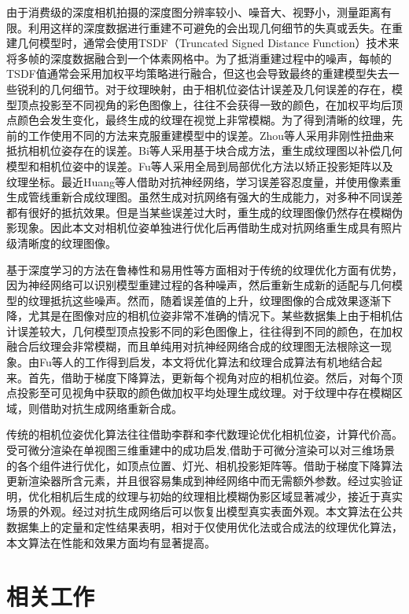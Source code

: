 由于消费级的深度相机拍摄的深度图分辨率较小、噪音大、视野小，测量距离有限。利用这样的深度数据进行重建不可避免的会出现几何细节的失真或丢失。在重建几何模型时，通常会使用TSDF（Truncated Signed Distance Function）技术来将多帧的深度数据融合到一个体素网格中。为了抵消重建过程中的噪声，每帧的TSDF值通常会采用加权平均策略进行融合，但这也会导致最终的重建模型失去一些锐利的几何细节。对于纹理映射，由于相机位姿估计误差及几何误差的存在，模型顶点投影至不同视角的彩色图像上，往往不会获得一致的颜色，在加权平均后顶点颜色会发生变化，最终生成的纹理在视觉上非常模糊。为了得到清晰的纹理，先前的工作使用不同的方法来克服重建模型中的误差。Zhou等人采用非刚性扭曲来抵抗相机位姿存在的误差。Bi等人采用基于块合成方法，重生成纹理图以补偿几何模型和相机位姿中的误差。Fu等人采用全局到局部优化方法以矫正投影矩阵以及纹理坐标。最近Huang等人借助对抗神经网络，学习误差容忍度量，并使用像素重生成管线重新合成纹理图。虽然生成对抗网络有强大的生成能力，对多种不同误差都有很好的抵抗效果。但是当某些误差过大时，重生成的纹理图像仍然存在模糊伪影现象。因此本文对相机位姿单独进行优化后再借助生成对抗网络重生成具有照片级清晰度的纹理图像。\par
基于深度学习的方法在鲁棒性和易用性等方面相对于传统的纹理优化方面有优势，因为神经网络可以识别模型重建过程的各种噪声，然后重新生成新的适配与几何模型的纹理抵抗这些噪声。然而，随着误差值的上升，纹理图像的合成效果逐渐下降，尤其是在图像对应的相机位姿非常不准确的情况下。某些数据集上由于相机估计误差较大，几何模型顶点投影不同的彩色图像上，往往得到不同的颜色，在加权融合后纹理会非常模糊，而且单纯用对抗神经网络合成的纹理图无法根除这一现象。由Fu等人的工作得到启发，本文将优化算法和纹理合成算法有机地结合起来。首先，借助于梯度下降算法，更新每个视角对应的相机位姿。然后，对每个顶点投影至可见视角中获取的颜色做加权平均处理生成纹理。对于纹理中存在模糊区域，则借助对抗生成网络重新合成。\par
传统的相机位姿优化算法往往借助李群和李代数理论优化相机位姿，计算代价高。受可微分渲染在单视图三维重建中的成功启发,借助于可微分渲染可以对三维场景的各个组件进行优化，如顶点位置、灯光、相机投影矩阵等。借助于梯度下降算法更新渲染器所含元素，并且很容易集成到神经网络中而无需额外参数。经过实验证明，优化相机后生成的纹理与初始的纹理相比模糊伪影区域显著减少，接近于真实场景的外观。经过对抗生成网络后可以恢复出模型真实表面外观。本文算法在公共数据集上的定量和定性结果表明，相对于仅使用优化法或合成法的纹理优化算法，本文算法在性能和效果方面均有显著提高。
\section{相关工作}
